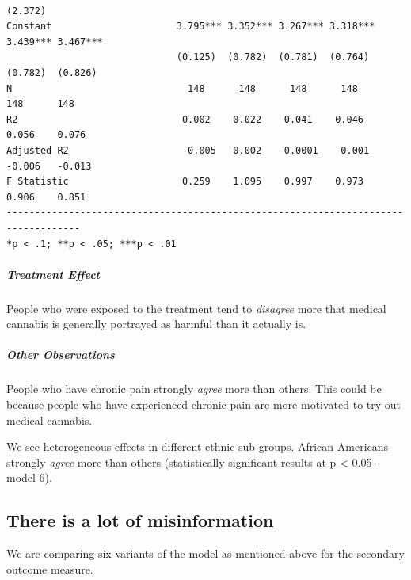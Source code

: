 \documentclass[
]{article}
\begin{document}
\begin{verbatim}
                                                                           (2.372) 
Constant                      3.795*** 3.352*** 3.267*** 3.318*** 3.439*** 3.467***
                              (0.125)  (0.782)  (0.781)  (0.764)  (0.782)  (0.826) 
N                               148      148      148      148      148      148   
R2                             0.002    0.022    0.041    0.046    0.056    0.076  
Adjusted R2                    -0.005   0.002   -0.0001   -0.001   -0.006   -0.013 
F Statistic                    0.259    1.095    0.997    0.973    0.906    0.851  
-----------------------------------------------------------------------------------
*p < .1; **p < .05; ***p < .01                                                     
\end{verbatim}

\hypertarget{treatment-effect-1}{%
\subparagraph{Treatment Effect}\label{treatment-effect-1}}

People who were exposed to the treatment tend to \emph{disagree} more
that medical cannabis is generally portrayed as harmful than it actually
is.

\hypertarget{other-observations-1}{%
\subparagraph{Other Observations}\label{other-observations-1}}

People who have chronic pain strongly \emph{agree} more than others.
This could be because people who have experienced chronic pain are more
motivated to try out medical cannabis.

We see heterogeneous effects in different ethnic sub-groups. African
Americans strongly \emph{agree} more than others (statistically
significant results at p \textless{} 0.05 - model 6).

\pagebreak

\hypertarget{there-is-a-lot-of-misinformation}{%
\subsection{There is a lot of
misinformation}\label{there-is-a-lot-of-misinformation}}

We are comparing six variants of the model as mentioned above for the
secondary outcome measure.
\end{document}
